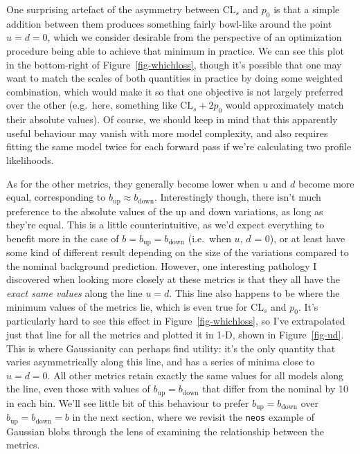 \documentclass[
  11pt,
  numbers=noendperiod]{book}
\begin{document}
One surprising artefact of the asymmetry between \(\mathrm{CL}_s\) and
\(p_0\) is that a simple addition between them produces something fairly
bowl-like around the point \(u = d = 0\), which we consider desirable
from the perspective of an optimization procedure being able to achieve
that minimum in practice. We can see this plot in the bottom-right of
Figure~\ref{fig-whichloss}, though it's possible that one may want to
match the scales of both quantities in practice by doing some weighted
combination, which would make it so that one objective is not largely
preferred over the other (e.g.~here, something like
\(\mathrm{CL}_s + 2p_0\) would approximately match their absolute
values). Of course, we should keep in mind that this apparently useful
behaviour may vanish with more model complexity, and also requires
fitting the same model twice for each forward pass if we're calculating
two profile likelihoods.

As for the other metrics, they generally become lower when \(u\) and
\(d\) become more equal, corresponding to
\(b_{\mathrm{up}} \approx b_{\mathrm{down}}\). Interestingly though,
there isn't much preference to the absolute values of the up and down
variations, as long as they're equal. This is a little counterintuitive,
as we'd expect everything to benefit more in the case of
\(b = b_{\mathrm{up}} = b_{\mathrm{down}}\) (i.e.~when \(u\), \(d\) =
0), or at least have some kind of different result depending on the size
of the variations compared to the nominal background prediction.
However, one interesting pathology I discovered when looking more
closely at these metrics is that they all have the \emph{exact same
values} along the line \(u=d\). This line also happens to be where the
minimum values of the metrics lie, which is even true for
\(\mathrm{CL}_s\) and \(p_0\). It's particularly hard to see this effect
in Figure~\ref{fig-whichloss}, so I've extrapolated just that line for
all the metrics and plotted it in 1-D, shown in Figure~\ref{fig-ud}.
This is where Gaussianity can perhaps find utility: it's the only
quantity that varies asymmetrically along this line, and has a series of
minima close to \(u = d = 0\). All other metrics retain exactly the same
values for all models along the line, even those with values of
\(b_{\mathrm{up}} = b_{\mathrm{down}}\) that differ from the nominal by
10 in each bin. We'll see little bit of this behaviour to prefer
\(b_{\mathrm{up}} = b_{\mathrm{down}}\) over
\(b_{\mathrm{up}} = b_{\mathrm{down}} = b\) in the next section, where
we revisit the \texttt{neos} example of Gaussian blobs through the lens
of examining the relationship between the metrics.
\end{document}
